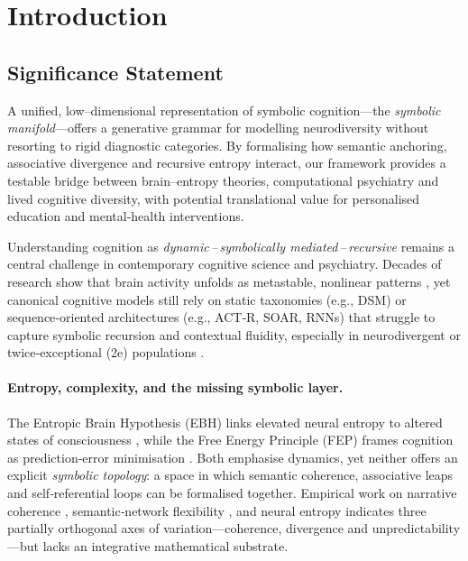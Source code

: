 \section{Introduction}

\subsection*{Significance Statement}
A unified, low–dimensional representation of symbolic cognition---the \emph{symbolic manifold}---offers a generative grammar for modelling neurodiversity without resorting to rigid diagnostic categories. By formalising how semantic anchoring, associative divergence and recursive entropy interact, our framework provides a testable bridge between brain–entropy theories, computational psychiatry and lived cognitive diversity, with potential translational value for personalised education and mental‑health interventions.

\bigskip
Understanding cognition as \emph{dynamic\,--\,symbolically mediated\,--\,recursive} remains a central challenge in contemporary cognitive science and psychiatry. Decades of research show that brain activity unfolds as metastable, nonlinear patterns \cite{kelso2012multistability,bassett2017network}, yet canonical cognitive models still rely on static taxonomies (e.g., DSM) or sequence‑oriented architectures (e.g., ACT‑R, SOAR, RNNs) that struggle to capture symbolic recursion and contextual fluidity, especially in neurodivergent or twice‑exceptional (2e) populations \cite{silberman2015neurodiversity}. 

\paragraph{Entropy, complexity, and the missing symbolic layer.}
The Entropic Brain Hypothesis (EBH) links elevated neural entropy to altered states of consciousness \cite{carhart2014entropic}, while the Free Energy Principle (FEP) frames cognition as prediction‑error minimisation \cite{friston2010free}. Both emphasise dynamics, yet neither offers an explicit \emph{symbolic topology}: a space in which semantic coherence, associative leaps and self‑referential loops can be formalised together. Empirical work on narrative coherence \cite{graesser1997coherence,marini2005coherence}, semantic‑network flexibility \cite{kenett2014semantic,kenett2019semantic}, and neural entropy \cite{schartner2017evidence} indicates three partially orthogonal axes of variation---coherence, divergence and unpredictability---but lacks an integrative mathematical substrate.

